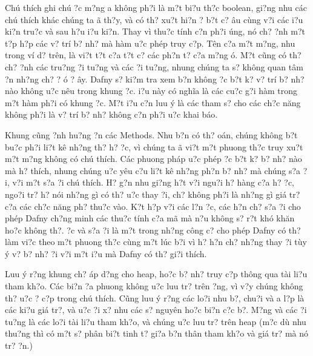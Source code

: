 \documentclass{article} %
\begin{document}
Ch\'{u} th\'{i}ch ghi ch\'{u} {\dj}?c m?ng a kh\^{o}ng ph?i l\`{a} m?t bi?u th?c boolean, gi?ng nhu c\'{a}c ch\'{u} th\'{i}ch kh\'{a}c ch\'{u}ng ta {\dj}\~{a} th?y, v\`{a} c\'{o} th? xu?t hi?n ? b?t c? {\dj}\^{a}u c\`{u}ng v?i c\'{a}c {\dj}i?u ki?n tru?c v\`{a} sau h?u {\dj}i?u ki?n. Thay v\`{i} thu?c t\'{i}nh c?n ph?i {\dj}\'{u}ng, n\'{o} ch? {\dj}?nh m?t t?p h?p c\'{a}c v? tr\'{i} b? nh? m\`{a} h\`{a}m {\dj}u?c ph\'{e}p truy c?p. T\^{e}n c?a m?t m?ng, nhu trong v\'{i} d? tr\^{e}n, l\`{a} vi?t t?t c?a t?t c? c\'{a}c ph?n t? c?a m?ng {\dj}\'{o}. M?t c\~{u}ng c\'{o} th? ch? {\dj}?nh c\'{a}c tru?ng {\dj}?i tu?ng v\`{a} c\'{a}c {\dj}?i tu?ng, nhung ch\'{u}ng ta s? kh\^{o}ng quan t\^{a}m {\dj}?n nh?ng ch? {\dj}? {\dj}\'{o} ? {\dj}\^{a}y. Dafny s? ki?m tra xem b?n kh\^{o}ng {\dj}?c b?t k? v? tr\'{i} b? nh? n\`{a}o kh\^{o}ng {\dj}u?c n\^{e}u trong khung {\dj}?c. {\DJ}i?u n\`{a}y c\'{o} ngh\~{i}a l\`{a} c\'{a}c cu?c g?i h\`{a}m trong m?t h\`{a}m ph?i c\'{o} khung {\dj}?c. M?t {\dj}i?u c?n luu \'{y} l\`{a} c\'{a}c tham s? cho c\'{a}c ch?c n\u{a}ng kh\^{o}ng ph?i l\`{a} v? tr\'{i} b? nh? kh\^{o}ng c?n ph?i {\dj}u?c khai b\'{a}o.

Khung c\~{u}ng ?nh hu?ng {\dj}?n c\'{a}c Methods. Nhu b?n c\'{o} th? {\dj}o\'{a}n, ch\'{u}ng kh\^{o}ng b?t bu?c ph?i li?t k\^{e} nh?ng th? h? {\dj}?c, v\`{i} ch\'{u}ng ta {\dj}\~{a} vi?t m?t phuong th?c truy xu?t m?t m?ng kh\^{o}ng c\'{o} ch\'{u} th\'{i}ch. C\'{a}c phuong ph\'{a}p {\dj}u?c ph\'{e}p {\dj}?c b?t k? b? nh? n\`{a}o m\`{a} h? th\'{i}ch, nhung ch\'{u}ng {\dj}u?c y\^{e}u c?u li?t k\^{e} nh?ng ph?n b? nh? m\`{a} ch\'{u}ng s?a {\dj}?i, v?i m?t s?a {\dj}?i ch\'{u} th\'{i}ch. H? g?n nhu gi?ng h?t v?i ngu?i h? h\`{a}ng c?a h? {\dj}?c, ngo?i tr? h? n\'{o}i nh?ng g\`{i} c\'{o} th? {\dj}u?c thay {\dj}?i, ch? kh\^{o}ng ph?i l\`{a} nh?ng g\`{i} gi\'{a} tr? c?a c\'{a}c ch?c n\u{a}ng ph? thu?c v\`{a}o. K?t h?p v?i c\'{a}c l?n {\dj}?c, c\'{a}c h?n ch? s?a {\dj}?i cho ph\'{e}p Dafny ch?ng minh c\'{a}c thu?c t\'{i}nh c?a m\~{a} m\`{a} n?u kh\^{o}ng s? r?t kh\'{o} kh\u{a}n ho?c kh\^{o}ng th?. {\DJ}?c v\`{a} s?a {\dj}?i l\`{a} m?t trong nh?ng c\^{o}ng c? cho ph\'{e}p Dafny c\'{o} th? l\`{a}m vi?c theo m?t phuong th?c c\`{u}ng m?t l\'{u}c b?i v\`{i} h? h?n ch? nh?ng thay {\dj}?i t\`{u}y \'{y} v? b? nh? {\dj}?i v?i m?t {\dj}i?u m\`{a} Dafny c\'{o} th? gi?i th\'{i}ch.

Luu \'{y} r?ng khung ch? \'{a}p d?ng cho heap, ho?c b? nh? truy c?p th\^{o}ng qua t\`{a}i li?u tham kh?o. C\'{a}c bi?n {\dj}?a phuong kh\^{o}ng {\dj}u?c luu tr? tr\^{e}n {\dj}?ng, v\`{i} v?y ch\'{u}ng kh\^{o}ng th? {\dj}u?c {\dj}? c?p trong ch\'{u} th\'{i}ch. C\~{u}ng luu \'{y} r?ng c\'{a}c lo?i nhu b?, chu?i v\`{a} {\dj}a l?p l\`{a} c\'{a}c ki?u gi\'{a} tr?, v\`{a} {\dj}u?c {\dj}?i x? nhu c\'{a}c s? nguy\^{e}n ho?c bi?n c?c b?. M?ng v\`{a} c\'{a}c {\dj}?i tu?ng l\`{a} c\'{a}c lo?i t\`{a}i li?u tham kh?o, v\`{a} ch\'{u}ng {\dj}u?c luu tr? tr\^{e}n heap (m?c d\`{u} nhu thu?ng th\`{i} c\'{o} m?t s? ph\^{a}n bi?t tinh t? gi?a b?n th\^{a}n tham kh?o v\`{a} gi\'{a} tr? m\`{a} n\'{o} tr? {\dj}?n.)
\end{document}
